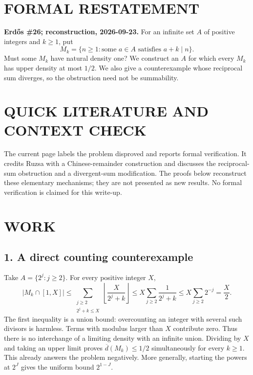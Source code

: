\section{FORMAL RESTATEMENT}
\textbf{Erd\H{o}s \#26; reconstruction, 2026-09-23.}
For an infinite set $A$ of positive integers and $k\geq1$, put
\[
 M_k=\{n\geq1:\text{some }a\in A\text{ satisfies }a+k\mid n\}.
\]
Must some $M_k$ have natural density one? We construct an $A$ for which
every $M_k$ has upper density at most $1/2$. We also give a counterexample
whose reciprocal sum diverges, so the obstruction need not be summability.

\section{QUICK LITERATURE AND CONTEXT CHECK}
The current page labels the problem disproved and reports formal
verification. It credits Ruzsa with a Chinese-remainder construction
and discusses the reciprocal-sum obstruction and a divergent-sum
modification. The proofs below reconstruct these elementary mechanisms;
they are not presented as new results. No formal verification is claimed
for this write-up.

\section{WORK}
\subsection{1. A direct counting counterexample}
Take $A=\{2^j:j\geq2\}$. For every positive integer $X$,
\[
 |M_k\cap[1,X]|
 \leq\sum_{\substack{j\geq2\\2^j+k\leq X}}
          \left\lfloor\frac{X}{2^j+k}\right\rfloor
 \leq X\sum_{j\geq2}\frac1{2^j+k}
 \leq X\sum_{j\geq2}2^{-j}=\frac X2.
\]
The first inequality is a union bound: overcounting an integer with
several such divisors is harmless. Terms with modulus larger than $X$
contribute zero. Thus there is no interchange of a limiting density
with an infinite union. Dividing by $X$ and taking an upper limit proves
$\overline d(M_k)\leq1/2$ simultaneously for every $k\geq1$.
This already answers the problem negatively. More generally, starting
the powers at $2^J$ gives the uniform bound $2^{1-J}$.

